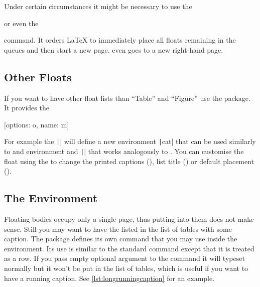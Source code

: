 Under certain circumstances it might be necessary to use the
\begin{lscommand}
   or even the 
\end{lscommand}
command. It orders \LaTeX{} to immediately place all floats remaining in the
queues and then start a new page.  even goes to a new
right-hand page.

\subsection{Other Floats}

If you want to have other float lists than \enquote{Table} and \enquote{Figure}
use the  package. It provides the
\begin{lscommand}
  [options: o, name: m]
\end{lscommand}
For example the \texttt|| will
define a new environment \texttt|cat| that can be used similarly to
 and  environment and \texttt|\listofcats| that
works analogously to . You can customise the float using the
 to change the printed captions (), list title
() or default placement ().

\subsection{The  Environment}

Floating bodies occupy only a single page, thus putting  into
them does not make sense. Still you may want to have the  listed
in the list of tables with some caption. The  package defines
its own  command that you may use inside the environment. Its use
is similar to the standard  command except that it is treated as a
row. If you pass empty optional argument to the  command it will
typeset normally but it won't be put in the list of tables, which is useful if
you want to have a running caption. See \autoref{lst:longrunningcaption} for an
example.

